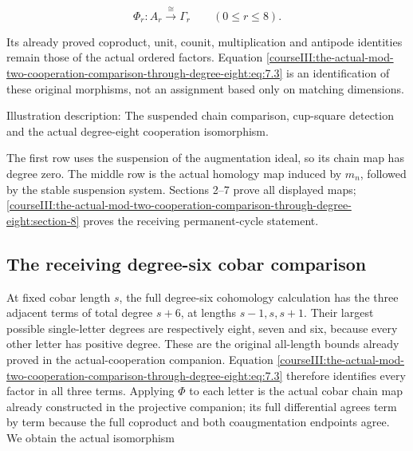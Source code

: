 \begin{equation}
\Phi_r:A_r\xrightarrow{\cong}\Gamma_r
\qquad(0\leq r\leq8).
\label{courseIII:the-actual-mod-two-cooperation-comparison-through-degree-eight:eq:7.3}
\end{equation}

Its already proved coproduct, unit, counit, multiplication and antipode identities remain those of the actual ordered factors. Equation \eqref{courseIII:the-actual-mod-two-cooperation-comparison-through-degree-eight:eq:7.3} is an identification of these original morphisms, not an assignment based only on matching dimensions.

Illustration description: The suspended chain comparison, cup-square detection and the actual degree-eight cooperation isomorphism.

The first row uses the suspension of the augmentation ideal, so its chain map has degree zero. The middle row is the actual homology map induced by \(m_n\), followed by the stable suspension system. Sections 2--7 prove all displayed maps; \cref{courseIII:the-actual-mod-two-cooperation-comparison-through-degree-eight:section-8} proves the receiving permanent-cycle statement.

\subsection{The receiving degree-six cobar comparison}
\label{courseIII:the-actual-mod-two-cooperation-comparison-through-degree-eight:actual-eight-receiving-cobar}

\label{courseIII:the-actual-mod-two-cooperation-comparison-through-degree-eight:section-8}\label{courseIII:actual-degree8:8}

At fixed cobar length \(s\), the full degree-six cohomology calculation has the three adjacent terms of total degree \(s+6\), at lengths \(s-1,s,s+1\). Their largest possible single-letter degrees are respectively eight, seven and six, because every other letter has positive degree. These are the original all-length bounds already proved in the actual-cooperation companion. Equation \eqref{courseIII:the-actual-mod-two-cooperation-comparison-through-degree-eight:eq:7.3} therefore identifies every factor in all three terms. Applying \(\Phi\) to each letter is the actual cobar chain map already constructed in the projective companion; its full differential agrees term by term because the full coproduct and both coaugmentation endpoints agree. We obtain the actual isomorphism

